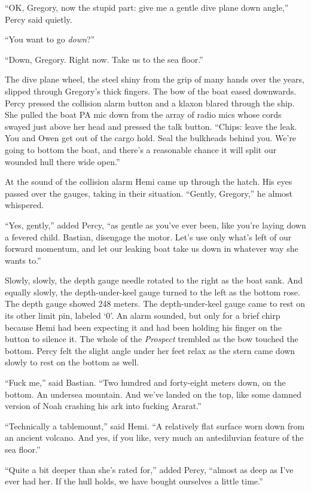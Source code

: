 \documentclass[
]{scrbook}
\begin{document}
``OK, Gregory, now the stupid part: give me a gentle dive plane down
angle,'' Percy said quietly.

``You want to go \emph{down}?''

``Down, Gregory. Right now. Take us to the sea floor.''

The dive plane wheel, the steel shiny from the grip of many hands over
the years, slipped through Gregory's thick fingers. The bow of the boat
eased downwards. Percy pressed the collision alarm button and a klaxon
blared through the ship. She pulled the boat PA mic down from the array
of radio mics whose cords swayed just above her head and pressed the
talk button. ``Chips: leave the leak. You and Owen get out of the cargo
hold. Seal the bulkheads behind you. We're going to bottom the boat, and
there's a reasonable chance it will split our wounded hull there wide
open.''

At the sound of the collision alarm Hemi came up through the hatch. His
eyes passed over the gauges, taking in their situation. ``Gently,
Gregory,'' he almost whispered.

``Yes, gently,'' added Percy, ``as gentle as you've ever been, like
you're laying down a fevered child. Bastian, disengage the motor. Let's
use only what's left of our forward momentum, and let our leaking boat
take us down in whatever way she wants to.''

Slowly, slowly, the depth gauge needle rotated to the right as the boat
sank. And equally slowly, the depth-under-keel gauge turned to the left
as the bottom rose. The depth gauge showed 248 meters. The
depth-under-keel gauge came to rest on its other limit pin, labeled `0'.
An alarm sounded, but only for a brief chirp because Hemi had been
expecting it and had been holding his finger on the button to silence
it. The whole of the \emph{Prospect} trembled as the bow touched the
bottom. Percy felt the slight angle under her feet relax as the stern
came down slowly to rest on the bottom as well.

``Fuck me,'' said Bastian. ``Two hundred and forty-eight meters down, on
the bottom. An undersea mountain. And we've landed on the top, like some
damned version of Noah crashing his ark into fucking Ararat.''

``Technically a tablemount,'' said Hemi. ``A relatively flat surface
worn down from an ancient volcano. And yes, if you like, very much an
antediluvian feature of the sea floor.''

``Quite a bit deeper than she's rated for,'' added Percy, ``almost as
deep as I've ever had her. If the hull holds, we have bought ourselves a
little time.''
\end{document}
